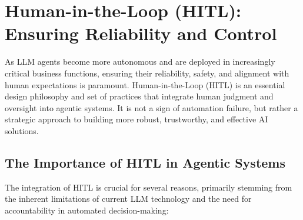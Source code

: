 \chapter{Human-in-the-Loop (HITL): Ensuring Reliability and Control}

As LLM agents become more autonomous and are deployed in increasingly critical business functions, ensuring their reliability, safety,
 and alignment with human expectations is paramount. Human-in-the-Loop (HITL) is an essential design philosophy and set of practices
  that integrate human judgment and oversight into agentic systems. It is not a sign of automation failure, but rather a strategic 
  approach to building more robust, trustworthy, and effective AI solutions.

\section{The Importance of HITL in Agentic Systems}
The integration of HITL is crucial for several reasons, primarily stemming from the inherent limitations of current LLM technology 
and the need for accountability in automated decision-making:
